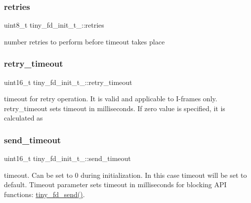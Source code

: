 \subsubsection{\texorpdfstring{retries}{retries}}
{\footnotesize\ttfamily uint8\+\_\+t tiny\+\_\+fd\+\_\+init\+\_\+t\+\_\+\+::retries}

number retries to perform before timeout takes place \mbox{\label{structtiny__fd__init__t___a54b9c689fba5aae8ccc0c29f05a159ca}} 
\subsubsection{\texorpdfstring{retry\+\_\+timeout}{retry\_timeout}}
{\footnotesize\ttfamily uint16\+\_\+t tiny\+\_\+fd\+\_\+init\+\_\+t\+\_\+\+::retry\+\_\+timeout}

timeout for retry operation. It is valid and applicable to I-\/frames only. retry\+\_\+timeout sets timeout in milliseconds. If zero value is specified, it is calculated as \mbox{\label{structtiny__fd__init__t___ae6653af324c07711c4b20360760c3e3a}} 
\subsubsection{\texorpdfstring{send\+\_\+timeout}{send\_timeout}}
{\footnotesize\ttfamily uint16\+\_\+t tiny\+\_\+fd\+\_\+init\+\_\+t\+\_\+\+::send\+\_\+timeout}

timeout. Can be set to 0 during initialization. In this case timeout will be set to default. Timeout parameter sets timeout in milliseconds for blocking A\+PI functions\+: \hyperlink{group__FULL__DUPLEX__API_ga490157ee98ea6148f99a5bb1f26c5f60}{tiny\+\_\+fd\+\_\+send()}. \mbox{\label{structtiny__fd__init__t___ae4da012c3e39c4e7dda587191b4c2f77}} 
